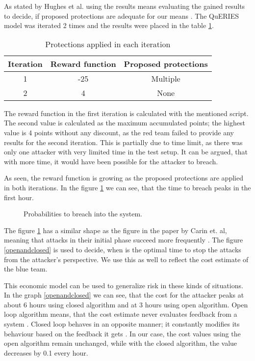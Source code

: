 As stated by Hughes et al. using the results means evaluating
the gained results to decide, if proposed protections are adequate for
our means \cite{hughes2013quantitative}. The QuERIES model was
iterated 2 times and the results were placed in the table \ref{iterationtable}.

\begin{table}[b!]
\centering
\begin{tabular}{|c|c|c|}
  \hline Iteration & Reward function & Proposed protections \\ \hline
  1 & -25 & Multiple \\ \hline 2 & 4 & None \\ \hline
\end{tabular}
\caption{Protections applied in each iteration}
\label{iterationtable}
\end{table}

The reward function in the first iteration is calculated with the
mentioned script. The second value is calculated as the maximum
accumulated points; the highest value is 4 points without any
discount, as the red team failed to provide any results for the second
iteration. This is partially due to time limit, as there was only one
attacker with very limited time in the test setup. It can be argued,
that with more time, it would have been possible for the attacker to
breach.

As seen, the reward function is growing as the proposed protections
are applied in both iterations. In the figure \ref{timetobreach} we can see, that the time to breach peaks in the
first hour.

\begin{figure}[t!]
\centerline{}
\caption{Probabilities to breach into the system.}
\label{timetobreach}
\end{figure}

The figure \ref{timetobreach} has a similar
shape as the figure in the paper by Carin et. al, meaning that attacks
in their initial phase succeed more frequently \cite{carin2008cybersecurity}. The figure \ref{openandclosed} is
used to decide, when is the optimal time to stop the attacks from the
attacker's perspective. We use this as well to reflect the cost estimate of
the blue team.

This economic model can be used to generalize risk in these kinds of
situations. In the graph \ref{openandclosed} we can see, that the cost
for the attacker peaks at about 6 hours using closed algorithm and at
3 hours using open algorithm. Open loop algorithm means, that the cost
estimate never evaluates feedback from a system
\cite{bars2006theory}. Closed loop behaves in an opposite manner; it
constantly modifies its behaviour based on the feedback it gets
\cite{bars2006theory}. In our case, the cost values using the open
algorithm remain unchanged, while with the closed algorithm, the value
decreases by 0.1 every hour.

